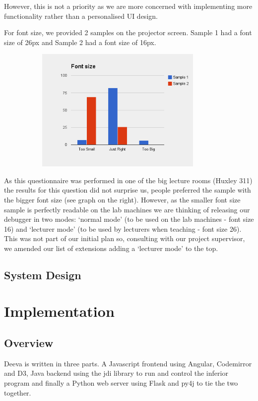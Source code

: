\documentclass[11pt, a4paper]{article}
\begin{document}
However, this is not a priority as we are more concerned with implementing more functionality rather than a personalised UI design.

For font size, we provided 2 samples on the projector screen.
Sample 1 had a font size of 26px and Sample 2 had a font size of 16px.
\begin{figure}[h!]
\centering
\includegraphics[height=60mm,width=100mm]{fonts.png}
\end{figure}
As this questionnaire was performed in one of the big lecture rooms (Huxley 311) the results for this question did not surprise us, people preferred the sample with the bigger font size (see graph on the right).
However, as the smaller font size sample is perfectly readable on the lab machines we are thinking of releasing our debugger in two modes: `normal mode' (to be used on the lab machines - font size 16) and  `lecturer mode' (to be used by lecturers when teaching - font size 26).
This was not part of our initial plan so, consulting with our project supervisor, we amended our list of extensions adding a `lecturer mode' to the top.

\subsection{System Design}

\section{Implementation}

\subsection{Overview}
Deeva is written in three parts.
A Javascript frontend using Angular, Codemirror and D3, Java backend using the jdi library to run and control the inferior program and finally a Python web server using Flask and py4j to tie the two together. 
\end{document}

